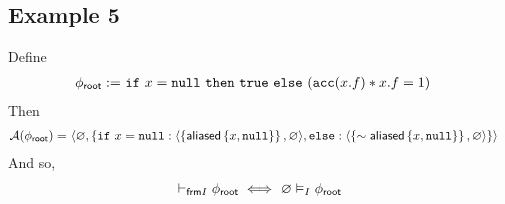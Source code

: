 \subsection*{Example 5}

Define
\begin{align*}
{\phi_\textsf{root}} := & \
\texttt{if} \ x = \texttt{null} \ \texttt{then} \ \texttt{true} \ \texttt{else} \ (\texttt{acc}(x.f) \ast x.f = 1)
\end{align*}
Then
\begin{align*}
\mathcal{A}({\phi_\textsf{root}}) = & \
\langle \varnothing, \left\{ 
  \texttt{if} \ x = \texttt{null}: \langle \left\{  \textsf{aliased}\left\{ x, \texttt{null} \right\}  \right\}, \varnothing \rangle,
  \texttt{else}: \langle \left\{  \sim\textsf{aliased}\left\{ x, \texttt{null} \right\}  \right\}, \varnothing \rangle
 \right\} \rangle
\end{align*}
And so,
\begin{align*}
\selfframing \phiroot
\iff & \
\empty \frames \phiroot \\
& %
\end{align*}

%
